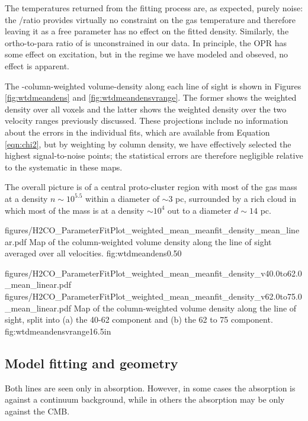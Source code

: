 The temperatures returned from the fitting process are, as expected, purely
noise: the \formaldehyde \oneone/\twotwo ratio provides virtually no constraint
on the gas temperature and therefore leaving it as a free parameter has no
effect on the fitted density.  Similarly, the ortho-to-para ratio of \hh is
unconstrained in our data.  In principle, the \hh OPR has some effect on
\formaldehyde excitation, but in the regime we have modeled and obseved, no
effect is apparent.


The \ortho-column-weighted volume-density along each line of sight is shown in
Figures \ref{fig:wtdmeandens} and \ref{fig:wtdmeandensvrange}.  The former
shows the weighted density over all voxels and the latter shows the weighted
density over the two velocity ranges previously discussed.  These projections
include no information about the errors in the individual fits, which are
available from Equation \ref{eqn:chi2}, but by weighting by column density, we
have effectively selected the highest signal-to-noise points; the statistical
errors are therefore negligible relative to the systematic in these maps.



The overall picture is of a central proto-cluster region with most of the gas
mass at a density $n\sim10^{5.5}$ \percc within a diameter of $\sim3$ pc, surrounded
by a rich cloud in which most of the mass is at a density $\sim10^4$ \percc out
to a diameter $d\sim14$ pc.


\Figure
{figures/H2CO_ParameterFitPlot_weighted_mean_meanfit_density_mean_linear.pdf}
{Map of the column-weighted volume density along the line of sight averaged
over all velocities.}
{fig:wtdmeandens}{0.5}{0}

\FigureTwoAA
{figures/H2CO_ParameterFitPlot_weighted_mean_meanfit_density_v40.0to62.0_mean_linear.pdf}
{figures/H2CO_ParameterFitPlot_weighted_mean_meanfit_density_v62.0to75.0_mean_linear.pdf}
{Map of the column-weighted volume density along the line of sight, split into 
(a) the 40-62 \kms component and (b) the 62 to 75 \kms component.}
{fig:wtdmeandensvrange}{1}{6.5in}

\subsection{Model fitting and geometry}
Both \formaldehyde lines are seen only in absorption.  However, in some cases
the absorption is against a continuum background, while in others the
absorption may be only against the CMB.

